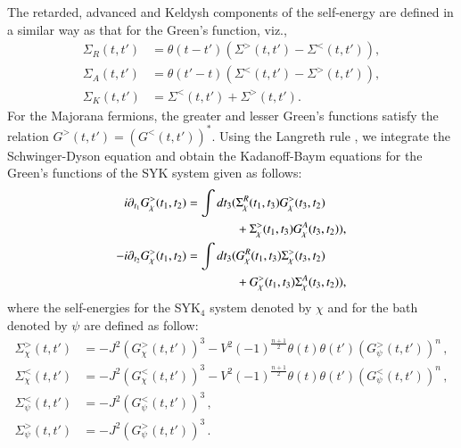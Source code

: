 The retarded, advanced and Keldysh components of the self-energy are defined in a similar way as that for the Green's function, viz.,
\begin{align}
\Sigma_{R}(t,t')&=\theta(t-t')(\Sigma^>(t,t')-\Sigma^<(t,t')),\\
\Sigma_{A}(t,t')&=\theta(t'-t)(\Sigma^<(t,t')-\Sigma^>(t,t')),\\
\Sigma_{K}(t,t')&=\Sigma^<(t,t')+\Sigma^>(t,t').
\end{align}
For the Majorana fermions, the greater and lesser Green's functions satisfy the relation $G^>(t,t')=(G^<(t,t'))^*$. Using the Langreth rule \cite{kamenev2023field}, we integrate the Schwinger-Dyson equation and obtain the Kadanoff-Baym equations for the Green's functions of the SYK system given as follows:
\begin{align}
 i\partial_{t_1}G^>_\chi(t_1,t_2)=\int d t_3 (&\Sigma^R_\chi(t_1,t_3)G^>_\chi(t_3,t_2)\notag \\ &+\Sigma^>_\chi(t_1,t_3)G^A_\chi(t_3,t_2)), \label{eq1}\\
 -i\partial_{t_2}G^>_\chi(t_1,t_2)=\int d t_3 (&G^R_\chi(t_1,t_3)\Sigma^>_\chi(t_3,t_2)\notag \\ &+G^>_\chi(t_1,t_3)\Sigma^A_\chi(t_3,t_2)),\label{eq2}
 \end{align}
where the self-energies for the SYK$_4$ system denoted by $\chi$ and for the bath denoted by $\psi$ are defined as follow:
\begin{align}
\Sigma_\chi^{>}(t,t') &= -J^2 (G^>_{\chi}(t,t'))^3-V^2(-1)^{\frac{n+1}{2}}\theta(t)\theta(t')(G^>_{\psi}(t,t'))^n\,,\\
\Sigma_\chi^{<}(t,t') &= -J^2 (G^<_{\chi}(t,t'))^3-V^2(-1)^{\frac{n+1}{2}}\theta(t)\theta(t')(G^<_{\psi}(t,t'))^n\,,\\
\Sigma_\psi^{<}(t,t')&=-J^2 (G^<_{\psi}(t,t'))^3\,,\\
\Sigma_\psi^{>}(t,t')&=-J^2 (G^>_{\psi}(t,t'))^3\,.
\label{Eq:sigmas}
\end{align}

